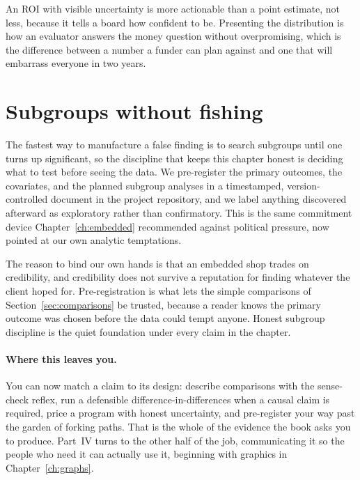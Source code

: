\documentclass[
    a4paper,
    fontsize=10pt,
    twoside=true,
    numbers=noenddot,
]{kaobook}
\begin{document}
An ROI with visible uncertainty is more actionable than a point estimate, not less, because it tells a board how confident to be. Presenting the distribution is how an evaluator answers the money question without overpromising, which is the difference between a number a funder can plan against and one that will embarrass everyone in two years.

\section{Subgroups without fishing}\label{sec:prereg}
The fastest way to manufacture a false finding is to search subgroups until one turns up significant, so the discipline that keeps this chapter honest is deciding what to test before seeing the data. We pre-register the primary outcomes, the covariates, and the planned subgroup analyses in a timestamped, version-controlled document in the project repository, and we label anything discovered afterward as exploratory rather than confirmatory. This is the same commitment device Chapter~\ref{ch:embedded} recommended against political pressure, now pointed at our own analytic temptations.

The reason to bind our own hands is that an embedded shop trades on credibility, and credibility does not survive a reputation for finding whatever the client hoped for. Pre-registration is what lets the simple comparisons of Section~\ref{sec:comparisons} be trusted, because a reader knows the primary outcome was chosen before the data could tempt anyone. Honest subgroup discipline is the quiet foundation under every claim in the chapter.

\paragraph{Where this leaves you.} You can now match a claim to its design: describe comparisons with the sense-check reflex, run a defensible difference-in-differences when a causal claim is required, price a program with honest uncertainty, and pre-register your way past the garden of forking paths. That is the whole of the evidence the book asks you to produce. Part~IV turns to the other half of the job, communicating it so the people who need it can actually use it, beginning with graphics in Chapter~\ref{ch:graphs}.

\end{document}
